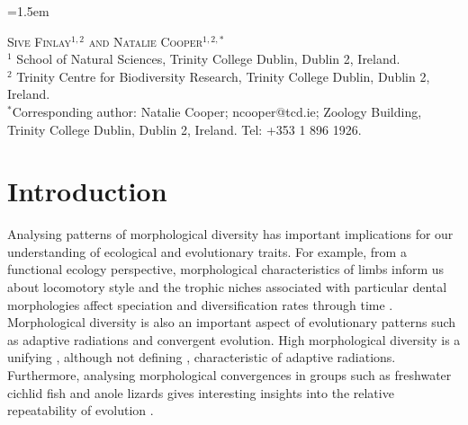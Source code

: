 \documentclass[12pt,a4paper]{article}
\begin{document}
\modulolinenumbers[1] 	%

\parindent=1.5em		%
\addtolength{\parskip}{.3em} %

\noindent
\textsc{Sive Finlay$^{1,2}$ and Natalie Cooper$^{1,2,*}$}\\

\noindent
$^1$ School of Natural Sciences, Trinity College Dublin, Dublin 2, Ireland.\\ 
\noindent
$^2$ Trinity Centre for Biodiversity Research, Trinity College Dublin, Dublin 2, Ireland.\\
\noindent
$^*$Corresponding author: Natalie Cooper; ncooper@tcd.ie; Zoology Building, Trinity College Dublin, Dublin 2, Ireland. Tel: +353 1 896 1926.\\

\newpage



\section{Introduction}

	Analysing patterns of morphological diversity has important implications for our understanding of ecological and evolutionary traits. For example, from a functional ecology perspective, morphological characteristics of limbs inform us about locomotory style \citep[e.g.][]{Bou1987} and the trophic niches associated with particular dental morphologies affect speciation and diversification rates through time \citep{Price2012}. Morphological diversity is also an important aspect of evolutionary patterns such as adaptive radiations and convergent evolution. High morphological diversity is a unifying \citep{Losos2010a, Olson2009}, although not defining \citep{Glor2010, Olson2009}, characteristic of adaptive radiations. Furthermore, analysing morphological convergences in groups such as freshwater cichlid fish \citep{Muschick2012} and anole lizards \citep{Mahler2013} gives interesting insights into the relative repeatability of evolution \citep{Losos2011}.
\end{document}
